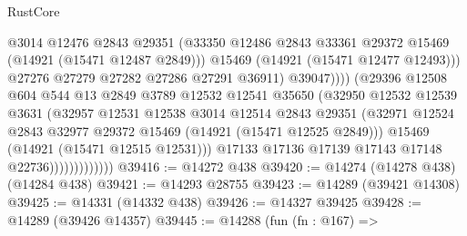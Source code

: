 \begin{lexlean}{RustCore}
\begin{coremodule}
                                      @3014
                                      @12476
                                      @2843
                                      @29351
                                      (@33350
                                        @12486
                                        @2843
                                        @33361
                                        @29372
                                        @15469
                                        (@14921 (@15471 @12487 @2849)))
                                      @15469
                                      (@14921 (@15471 @12477 @12493)))
                                    @27276
                                    @27279
                                    @27282
                                    @27286
                                    @27291
                                    @36911)
                                  @39047))))
                          (@29396
                            @12508
                            @604
                            @544
                            @13
                            @2849
                            @3789
                            @12532
                            @12541
                            @35650
                            (@32950
                              @12532
                              @12539
                              @3631
                              (@32957
                                @12531
                                @12538
                                @3014
                                @12514
                                @2843
                                @29351
                                (@32971
                                  @12524
                                  @2843
                                  @32977
                                  @29372
                                  @15469
                                  (@14921 (@15471 @12525 @2849)))
                                @15469
                                (@14921 (@15471 @12515 @12531)))
                              @17133
                              @17136
                              @17139
                              @17143
                              @17148
                              @22736)))))))))))))
@39416 := @14272 @438
@39420 := @14274 (@14278 @438) (@14284 @438)
@39421 := @14293 @28755
@39423 := @14289 (@39421 @14308)
@39425 := @14331 (@14332 @438)
@39426 := @14327 @39425
@39428 := @14289 (@39426 @14357)
@39445 := @14288
    (fun (fn : @167) =>

\end{coremodule}
\end{lexlean}

